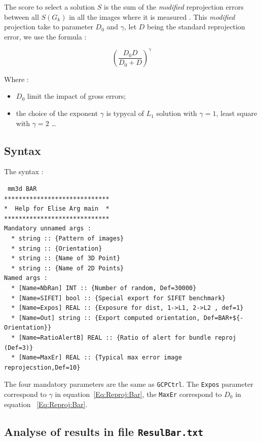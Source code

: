 The score to select a solution $S$ is the sum of the \emph{modified} reprojection
errors between all $S(G_k)$ in all the images where it is measured  . 
This  \emph{modified} projection take to parameter $D_0$ and $\gamma$, let $D$ being the
standard reprojection error, we use the formula :

\begin{equation}
    (\frac{D_0 D}{D_0 + D}) ^ \gamma \label{Eq:Reproj:Bar}
\end{equation}

Where :

\begin{itemize}
   \item $D_0$ limit the impact of gross errors;
   \item the choice of the exponent $ \gamma$ is typycal of $L_1$ solution with  $ \gamma=1$,
         least square with  $ \gamma=2$ \dots
\end{itemize}


\subsection{Syntax}

The syntax :

\begin{verbatim}
 mm3d BAR 
*****************************
*  Help for Elise Arg main  *
*****************************
Mandatory unnamed args : 
  * string :: {Pattern of images}
  * string :: {Orientation}
  * string :: {Name of 3D Point}
  * string :: {Name of 2D Points}
Named args : 
  * [Name=NbRan] INT :: {Number of random, Def=30000}
  * [Name=SIFET] bool :: {Special export for SIFET benchmark}
  * [Name=Expos] REAL :: {Exposure for dist, 1->L1, 2->L2 , def=1}
  * [Name=Out] string :: {Export computed orientation, Def=BAR+${-Orientation}}
  * [Name=RatioAlertB] REAL :: {Ratio of alert for bundle reproj (Def=3)}
  * [Name=MaxEr] REAL :: {Typical max error image reprojecstion,Def=10}
\end{verbatim}


The four mandatory parameters are the same as {\tt GCPCtrl}. The {\tt Expos} parameter
correspond to $\gamma$ in equation~\ref{Eq:Reproj:Bar}, the {\tt MaxEr}
correspond to $D_0$ in equation ~\ref{Eq:Reproj:Bar}.

\subsection{Analyse of results in file {\tt ResulBar.txt}}

